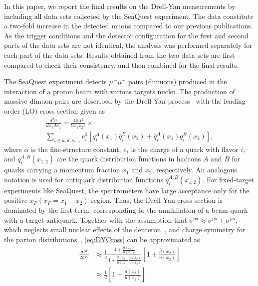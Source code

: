 \documentclass[reprint,aps,unsortedaddress,superscriptaddress,prl,floatfix,showpacs,linenumbers]{revtex4-2}
\begin{document}
In this paper, we report the final results on the Drell-Yan measurements
by including all data sets collected by the SeaQuest experiment.
The data constitute a two-fold increase in the detected muons compared
to our previous publications. As the trigger
conditions and the detector configuration for the first and second parts
of the data sets are not
identical, the analysis was performed separately for each part of the
data sets.
Results obtained from the two data sets are first compared to check their
consistency, and then combined for the final results.

The SeaQuest experiment detects $\mu^+\mu^-$ pairs (dimuons) produced in
the interaction of a proton beam with various targets nuclei. The production
of massive dimuon pairs are described by the Drell-Yan
process~\cite{drell1970} with the leading order (LO) cross section given as
\begin{multline}
	\frac{d^2\sigma}{dx_1dx_2}=\frac{4\pi \alpha^2}{9x_1x_2s} \times
	\label{eq:DYCross} \\
	\sum_{i\in u,d,s,\dots} e_i^2 \left[q_i^A\left(x_1\right) \bar q_i^B\left(x_2\right) + \bar q_i^A\left(x_1\right)
		q_i^B\left(x_2\right)\right],
\end{multline}
where $\alpha$ is the fine-structure constant, $e_i$ is the charge of a quark
with flavor $i$, and $q_i^{A,B}\left(x_{1,2}\right)$ are the quark
distribution functions in hadrons $A$ and $B$
for quarks carrying a momentum fraction $x_1$ and $x_2$, respectively.
An analogous notation is used for antiquark distribution functions
$\bar q_i^{A,B}\left(x_{1,2}\right)$.
For fixed-target experiments like SeaQuest, the spectrometers have
large acceptance only for the positive $x_F (x_F = x_1 - x_2)$ region. %
Thus, the Drell-Yan cross section is dominated by
the first term, corresponding to the annihilation of a beam quark with
a target antiquark. Together with the assumption that
$\sigma^{pd} \approx \sigma^{pp} + \sigma^{pn}$,
which neglects small nuclear effects of the
deuteron~\cite{kumano1998,ehlers2014},
and charge symmetry for the parton distributions~\cite{londergan2010},
\cref{eq:DYCross} can be approximated as
\begin{equation}
	\begin{split}
		\frac{\sigma^{pd}}{2\sigma^{pp}} & \approx
		\frac{1}{2} \frac{4+\frac{d\left(x_1\right)}
			{u\left(x_1\right)}}{4+\frac{d\left(x_1\right)}
			{u\left(x_1\right)}\frac{\bar d\left(x_2\right)}{\bar u\left(x_2\right)}}
		\left[1+\frac{\bar d\left(x_2\right)}{\bar u\left(x_2\right)}\right]                         \\
		                                 & \approx \frac{1}{2} \left[1+\frac{\bar d\left(x_2\right)}
			{\bar u\left(x_2\right)}\right].
	\end{split}
	\label{eq:crRatio}
\end{equation}
\end{document}
